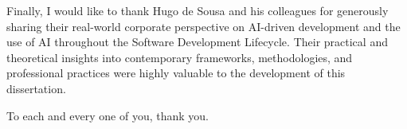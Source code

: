 Finally, I would like to thank Hugo de Sousa and his colleagues for generously sharing their real-world corporate perspective on AI-driven development and the use of AI throughout the Software Development Lifecycle. Their practical and theoretical insights into contemporary frameworks, methodologies, and professional practices were highly valuable to the development of this dissertation.

To each and every one of you, thank you.